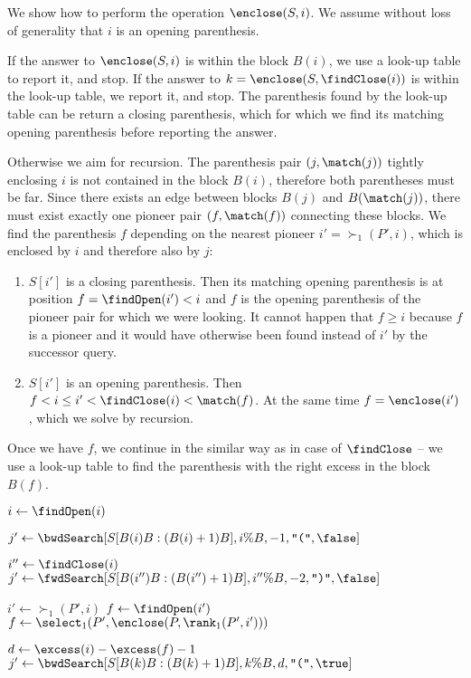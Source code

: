 We show how to perform the operation $\enclose(S, i)$.
We assume without loss of generality that $i$ is an opening parenthesis.

If the answer to $\enclose(S, i)$ is within the block $B(i)$, we use a look-up table to report it, and stop.
If the answer to $k = \enclose(S, \findClose(i))$ is within the look-up table, we report it, and stop.
The parenthesis found by the look-up table can be return a closing parenthesis, which for which we find its matching opening parenthesis before reporting the answer.

Otherwise we aim for recursion.
The parenthesis pair $(j, \match(j))$ tightly enclosing $i$ is not contained in the block $B(i)$, therefore both parentheses must be far.
Since there exists an edge between blocks $B(j)$ and $B(\match(j))$, there must exist exactly one pioneer pair $(f, \match(f))$ connecting these blocks.
We find the parenthesis $f$ depending on the nearest pioneer $i' = \succ_1(P', i)$, which is enclosed by $i$ and therefore also by $j$:
\begin{enumerate}
	\item $S[i']$ is a closing parenthesis.
	Then its matching opening parenthesis is at position $f = \findOpen(i') < i$ and $f$ is the opening parenthesis of the pioneer pair for which we were looking.
	It cannot happen that $f \ge i$ because $f$ is a pioneer and it would have otherwise been found instead of $i'$ by the successor query.
	\item $S[i']$ is an opening parenthesis.
	Then $f < i \le i' < \findClose(i) < \match(f)$.
	At the same time $f = \enclose(i')$, which we solve by recursion.
\end{enumerate}
Once we have $f$, we continue in the similar way as in case of $\findClose$ -- we use a look-up table to find the parenthesis with the right excess in the block $B(f)$.

\begin{algorithm}
\begin{algorithmic}
		\State $i \gets \findOpen(i)$
	\EndIf

	\State $j' \gets \bwdSearch[S[B(i)B : (B(i)+1) B], i \% B, -1, \openingParen, \false]$
		\State {} 
	\EndIf
	
	\State $i'' \gets \findClose(i)$
	\State $j' \gets \fwdSearch[S[B(i'')B : (B(i'')+1) B], i'' \% B, -2, \closingParen, \false]$
		\State {} 
	\EndIf
	
	\State

	\State $i' \gets \succ_1(P', i)$
		\State $f \gets \findOpen(i')$
	\Else
		\State $f \gets \select_1(P', \enclose(P, \rank_1(P', i')))$ 
	\EndIf
	
	\State $d \gets \excess(i) - \excess(f) - 1$
	\State $j' \gets \bwdSearch[S[B(k)B: (B(k) + 1)B], k \% B, d, \openingParen, \true]$
	\State {}
\EndFunction
\end{algorithmic}
\end{algorithm}

